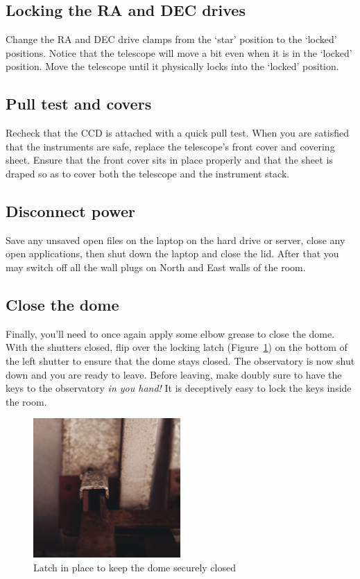 \documentclass[12pt,twoside,a4paper]{report}
\begin{document}
\subsection{Locking the RA and DEC drives}

Change the RA and DEC drive clamps from the `star' position to the `locked' positions. 
Notice that the telescope will move a bit even when it is in the `locked' position. Move the
telescope until it physically locks into the `locked' position.

\subsection{Pull test and covers}
Recheck that the CCD is attached with a quick pull test. When you are satisfied that the instruments are safe, replace the telescope's front cover and covering sheet. Ensure that the front cover sits in place properly and that the sheet is draped so as to cover both the telescope and the instrument stack.

\subsection{Disconnect power}

Save any unsaved open files on the laptop on the hard drive or server, close any open applications, then shut down the laptop and close the lid. After that you may switch off all the wall plugs on North and East walls of the room.

\subsection{Close the dome}

Finally, you'll need to once again apply some elbow grease to close the dome. With the shutters closed, flip over the locking latch (Figure~\ref{fig:latch}) on the bottom of the left shutter to ensure that the dome stays closed. The observatory is now shut down and you are ready to leave. Before leaving, make doubly sure to have the keys to the observatory \emph{in you hand!} It is deceptively easy to lock the keys inside the room.\\

\begin{figure}[ht]
  \centering
    \includegraphics[width=0.5\textwidth]{documentation_images/domelatch.jpg}
    \caption{\label{fig:latch}Latch in place to keep the dome securely closed}
\end{figure}
\end{document}
